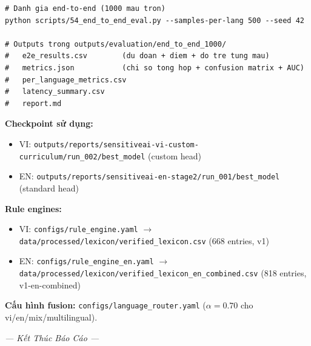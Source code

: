 \documentclass[11pt,a4paper]{article}
\begin{document}
\begin{verbatim}
# Danh gia end-to-end (1000 mau tron)
python scripts/54_end_to_end_eval.py --samples-per-lang 500 --seed 42

# Outputs trong outputs/evaluation/end_to_end_1000/
#   e2e_results.csv        (du doan + diem + do tre tung mau)
#   metrics.json           (chi so tong hop + confusion matrix + AUC)
#   per_language_metrics.csv
#   latency_summary.csv
#   report.md
\end{verbatim}

\medskip
\textbf{Checkpoint sử dụng:}
\begin{itemize}
    \item VI:
          \texttt{outputs/reports/sensitiveai-vi-custom-curriculum/run\_002/best\_model}
          (custom head)
    \item EN: \texttt{outputs/reports/sensitiveai-en-stage2/run\_001/best\_model}
          (standard head)
\end{itemize}

\medskip
\textbf{Rule engines:}
\begin{itemize}
    \item VI: \texttt{configs/rule\_engine.yaml} $\rightarrow$
          \texttt{data/processed/lexicon/verified\_lexicon.csv} (668 entries, v1)
    \item EN: \texttt{configs/rule\_engine\_en.yaml} $\rightarrow$
          \texttt{data/processed/lexicon/verified\_lexicon\_en\_combined.csv} (818
          entries, v1-en-combined)
\end{itemize}

\medskip
\textbf{Cấu hình fusion:} \texttt{configs/language\_router.yaml} ($\alpha=0.70$ cho vi/en/mix/multilingual).

\vfill
\begin{center}
    \textit{--- Kết Thúc Báo Cáo ---}
\end{center}
\end{document}
